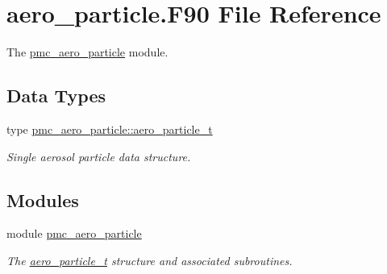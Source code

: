 \hypertarget{aero__particle_8_f90}{}\section{aero\+\_\+particle.\+F90 File Reference}
\label{aero__particle_8_f90}


The \mbox{\hyperlink{namespacepmc__aero__particle}{pmc\+\_\+aero\+\_\+particle}} module.  


\subsection*{Data Types}
\begin{DoxyCompactItemize}
\item 
type \mbox{\hyperlink{structpmc__aero__particle_1_1aero__particle__t}{pmc\+\_\+aero\+\_\+particle\+::aero\+\_\+particle\+\_\+t}}
\begin{DoxyCompactList}\small\item\em Single aerosol particle data structure. \end{DoxyCompactList}\end{DoxyCompactItemize}
\subsection*{Modules}
\begin{DoxyCompactItemize}
\item 
module \mbox{\hyperlink{namespacepmc__aero__particle}{pmc\+\_\+aero\+\_\+particle}}
\begin{DoxyCompactList}\small\item\em The \mbox{\hyperlink{structpmc__aero__particle_1_1aero__particle__t}{aero\+\_\+particle\+\_\+t}} structure and associated subroutines. \end{DoxyCompactList}\end{DoxyCompactItemize}
